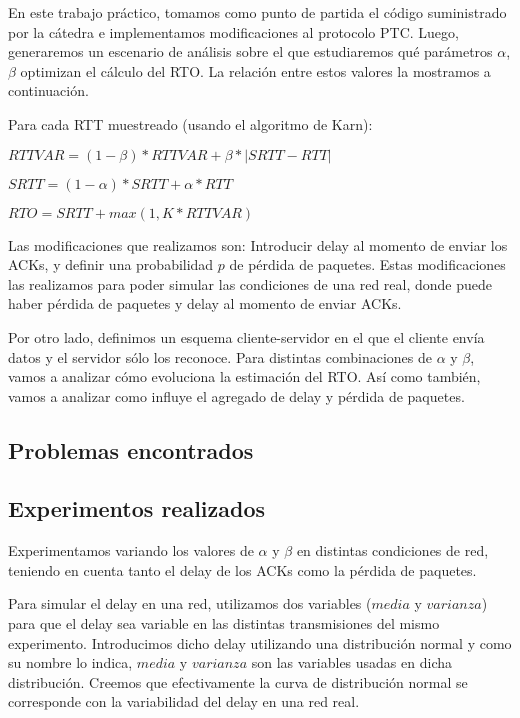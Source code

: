 En este trabajo práctico, tomamos como punto de partida el código suministrado por la cátedra e implementamos modificaciones al protocolo PTC. Luego, generaremos un escenario de análisis sobre el que estudiaremos qué parámetros $\alpha$, $\beta$ optimizan el cálculo del RTO. La relación entre estos valores la mostramos a continuación.

Para cada RTT muestreado (usando el algoritmo de Karn):

\indent \indent $RTTVAR = (1-\beta) * RTTVAR + \beta * |SRTT-RTT|$

\indent \indent $SRTT = (1-\alpha) * SRTT + \alpha * RTT$

\indent \indent $RTO = SRTT + max (1,K * RTTVAR)$

Las modificaciones que realizamos son: Introducir delay al momento de enviar los ACKs, y definir una probabilidad $p$ de pérdida de paquetes. Estas modificaciones las realizamos para poder simular las condiciones de una red real, donde puede haber pérdida de paquetes y delay al momento de enviar ACKs.

Por otro lado, definimos un esquema cliente-servidor en el que el cliente envía datos y el servidor sólo los reconoce. Para distintas combinaciones de $\alpha$ y $\beta$, vamos a analizar cómo evoluciona la estimación del RTO. Así como también, vamos a analizar como influye el agregado de delay y pérdida de paquetes.

\subsection{Problemas encontrados}

\subsection{Experimentos realizados}
Experimentamos variando los valores de $\alpha$ y $\beta$ en distintas condiciones de red, teniendo en cuenta tanto el delay de los ACKs como la pérdida de paquetes.


Para simular el delay en una red, utilizamos dos variables ($media$ y $varianza$) para que el delay sea variable en las distintas transmisiones del mismo experimento. Introducimos dicho delay utilizando una distribución normal y como su nombre lo indica, $media$ y $varianza$ son las variables usadas en dicha distribución. Creemos que efectivamente la curva de distribución normal se corresponde con la variabilidad del delay en una red real.

